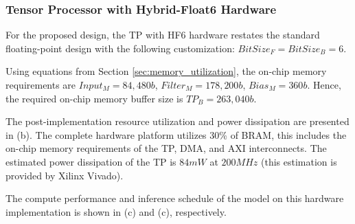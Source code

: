 \subsubsection{Tensor Processor with Hybrid-Float6 Hardware}
For the proposed design, the TP with HF6 hardware restates the standard floating-point design with the following customization: $BitSize_F=BitSize_B=6$.

Using equations from Section \ref{sec:memory_utilization}, the on-chip memory requirements are $Input_M=84,480b$, $Filter_M=178,200b$, $Bias_M=360b$. Hence, the required on-chip memory buffer size is $TP_B=263,040b$.

The post-implementation resource utilization and power dissipation are presented in (b). The complete hardware platform utilizes 30\% of BRAM, this includes the on-chip memory requirements of the TP, DMA, and AXI interconnects. The estimated power dissipation of the TP is $84mW$ at $200MHz$ (this estimation is provided by Xilinx Vivado).

The compute performance and inference schedule of the model on this hardware implementation is shown in (c) and (c), respectively.


